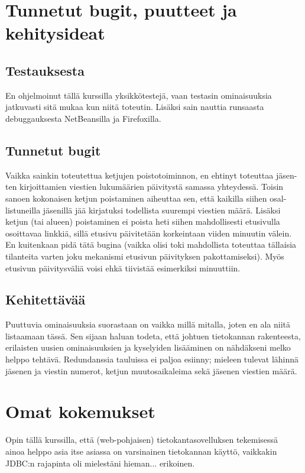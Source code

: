 \documentclass[11pt]{article}
\begin{document}
	\section{Tunnetut bugit, puutteet ja kehitysideat}
		\subsection{Testauksesta}
			En ohjelmoinut tällä kurssilla yksikkötestejä, vaan testasin ominaisuuksia jatkuvasti sitä mukaa
			kun niitä toteutin. Lisäksi sain nauttia runsaasta debuggauksesta NetBeansilla ja Firefoxilla.
			
		\subsection{Tunnetut bugit}
			Vaikka sainkin toteutettua ketjujen poistotoiminnon, en ehtinyt toteuttaa jäsen-ten kirjoittamien
			viestien lukumäärien päivitystä samassa yhteydessä. Toisin sanoen kokonaisen ketjun poistaminen
			aiheuttaa sen, että kaikilla siihen osal-listuneilla jäsenillä jää kirjatuksi todellista suurempi
			viestien määrä. Lisäksi ketjun (tai alueen) poistaminen ei poista heti siihen mahdollisesti
			etusivulla osoittavaa linkkiä, sillä etusivu päivitetään korkeintaan viiden minuutin välein. En
			kuitenkaan pidä tätä bugina (vaikka olisi toki mahdollista toteuttaa tällaisia tilanteita varten
			joku mekanismi etusivun päivityksen pakottamiseksi). Myös etusivun päivitysväliä voisi ehkä
			tiivistää esimerkiksi minuuttiin.
			
		\subsection{Kehitettävää}
			Puuttuvia ominaisuuksia suorastaan on vaikka millä mitalla, joten en ala niitä listaamaan tässä.
			Sen sijaan haluan todeta, että johtuen tietokannan rakenteesta, erilaisten uusien ominaisuuksien
			ja kyselyiden lisääminen on nähdäkseni melko helppo tehtävä. Redundanssia tauluissa ei paljoa
			esiinny; mieleen tulevat lähinnä jäsenen ja viestin numerot, ketjun muutosaikaleima
			sekä jäsenen viestien määrä.
		
\newpage
\thispagestyle{plain}
	\section{Omat kokemukset}
		Opin tällä kurssilla, että (web-pohjaisen) tietokantasovelluksen tekemisessä\\ ainoa helppo asia itse
		asiassa on varsinainen tietokannan käyttö, vaikkakin JDBC:n rajapinta oli mielestäni hieman...
		erikoinen.
	
\end{document}
